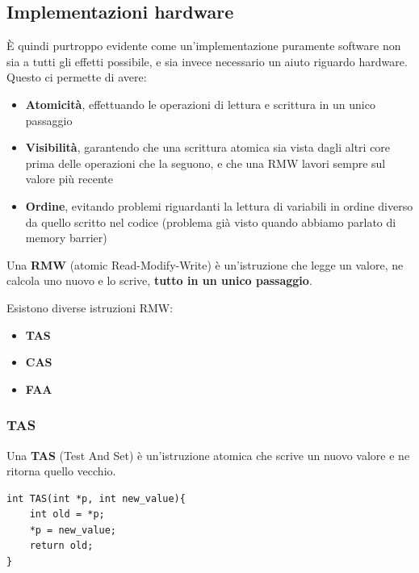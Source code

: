\documentclass[11pt, a4paper, titlepage, oneside]{scrbook}
\begin{document}
\subsection{Implementazioni hardware}

È quindi purtroppo evidente come un'implementazione puramente software non sia a tutti gli effetti possibile, e sia invece necessario un aiuto riguardo hardware. Questo ci permette di avere:
\begin{itemize}
    \item \textbf{Atomicità}, effettuando le operazioni di lettura e scrittura in un unico passaggio
    \item \textbf{Visibilità}, garantendo che una scrittura atomica sia vista dagli altri core prima delle operazioni che la seguono, e che una RMW lavori sempre sul valore più recente
    \item \textbf{Ordine}, evitando problemi riguardanti la lettura di variabili in ordine diverso da quello scritto nel codice (problema già visto quando abbiamo parlato di memory barrier)
\end{itemize}

\begin{Definizione}[RMW]
\label{def-RMW}
Una \textbf{RMW} (atomic Read-Modify-Write) è un'istruzione che legge un valore, ne calcola uno nuovo e lo scrive, \textbf{tutto in un unico passaggio}.
\end{Definizione}

Esistono diverse istruzioni RMW:
\begin{itemize}
    \item \textbf{TAS} 
    \item \textbf{CAS}
    \item \textbf{FAA}
\end{itemize}

\subsubsection*{TAS}

\begin{Definizione}[TAS]
\label{def-TAS}
Una \textbf{TAS} (Test And Set) è un'istruzione atomica che scrive un nuovo valore e ne ritorna quello vecchio.
\end{Definizione}

\begin{lstlisting}[style=C]
int TAS(int *p, int new_value){
    int old = *p;
    *p = new_value;
    return old;
}
\end{lstlisting}
\end{document}
